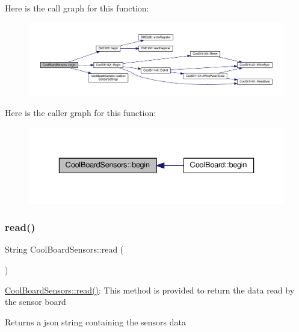 Here is the call graph for this function\+:
\nopagebreak
\begin{figure}[H]
\begin{center}
\leavevmode
\includegraphics[width=350pt]{de/d46/class_cool_board_sensors_a97095823ef7c8f5290812f1405b966b3_cgraph}
\end{center}
\end{figure}
Here is the caller graph for this function\+:
\nopagebreak
\begin{figure}[H]
\begin{center}
\leavevmode
\includegraphics[width=336pt]{de/d46/class_cool_board_sensors_a97095823ef7c8f5290812f1405b966b3_icgraph}
\end{center}
\end{figure}
\mbox{\label{class_cool_board_sensors_a91badb2539d91fda8679f2a597874c48}} 
\subsubsection{\texorpdfstring{read()}{read()}}
{\footnotesize\ttfamily String Cool\+Board\+Sensors\+::read (\begin{DoxyParamCaption}{ }\end{DoxyParamCaption})}

\hyperlink{class_cool_board_sensors_a91badb2539d91fda8679f2a597874c48}{Cool\+Board\+Sensors\+::read()}\+: This method is provided to return the data read by the sensor board

\begin{DoxyReturn}{Returns}
a json string containing the sensors data 
\end{DoxyReturn}



